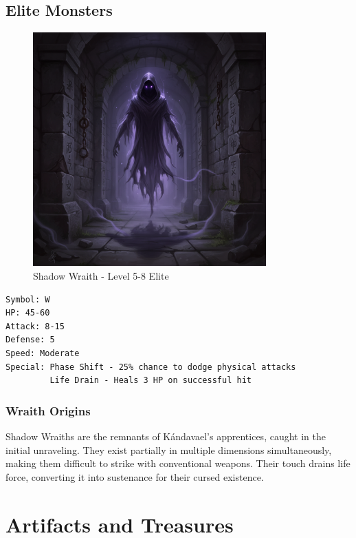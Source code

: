 \documentclass[11pt,a4paper]{book}
\begin{document}
\section{Elite Monsters}

\begin{figure}[H]
    \centering
    \includegraphics[width=0.8\textwidth]{images/shadow-wraith.png}
    \caption{Shadow Wraith - Level 5-8 Elite}
\end{figure}

\begin{mechanicsbox}
\begin{verbatim}
Symbol: W
HP: 45-60
Attack: 8-15
Defense: 5
Speed: Moderate
Special: Phase Shift - 25% chance to dodge physical attacks
         Life Drain - Heals 3 HP on successful hit
\end{verbatim}
\end{mechanicsbox}

\subsection{Wraith Origins}

Shadow Wraiths are the remnants of Kándavael's apprentices, caught in the initial unraveling. They exist partially in multiple dimensions simultaneously, making them difficult to strike with conventional weapons. Their touch drains life force, converting it into sustenance for their cursed existence.

\chapter{Artifacts and Treasures}
\end{document}
